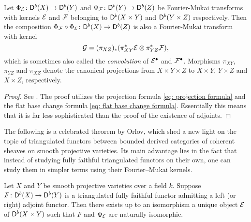 \begin{proposition}
    \label{Composition of fm is fm}
    Let $\Phi_{\mathcal E} \colon \mathsf{D}^b(X) \to \mathsf{D}^b(Y)$ and $\Phi_{\mathcal F} \colon \mathsf{D}^b(Y) \to \mathsf{D}^b(Z)$ be Fourier-Mukai transforms with kernels $\mathcal E$ and $\mathcal F$ belonging to $\mathsf{D}^b(X \times Y)$ and $\mathsf{D}^b(Y \times Z)$ respectively. Then the composition $\Phi_{\mathcal F} \circ \Phi_{\mathcal E} \colon \mathsf{D}^b(X) \to \mathsf{D}^b(Z)$ is also a Fourier-Mukai transform with kernel
    \[
        \mathcal G = (\pi_{XZ})_*(\pi_{XY}^*\mathcal E \otimes \pi_{YZ}^*\mathcal F),
    \]
    which is sometimes also called the \emph{convolution} of $\mathcal E^\bullet$ and $\mathcal F^\bullet$. Morphisms $\pi_{XY}$, $\pi_{YZ}$ and $\pi_{XZ}$ denote the canonical projections from $X \times Y \times Z$ to $X \times Y$, $Y \times Z$ and $X \times Z$, respectively.
\end{proposition}

\begin{proof}
    See \cite[\S 5, 5.10]{huybrechts2006fouriermukai}. The proof utilizes the projection formula \eqref{eq: projection formula} and the flat base change formula \eqref{eq: flat base change formula}. Essentially this means that it is far less sophisticated than the proof of the existence of adjoints.    
\end{proof}

The following is a celebrated theorem by Orlov, which shed a new light on the topic of triangulated functors between bounded derived categories of coherent sheaves on smooth projective varieties. Its main advantage lies in the fact that instead of studying fully faithful triangulated functors on their own, one can study them in simpler terms using their Fourier--Mukai kernels. 

\begin{theorem}
    \label{Orlov's theorem}
    Let $X$ and $Y$ be smooth projective varieties over a field $k$. Suppose $F \colon \mathsf{D}^b(X) \to \mathsf{D}^b(Y)$ is a triangulated fully faithful functor admitting a left (or right) adjoint functor. Then there exists up to an isomorphism a unique object $\mathcal E$ of $\mathsf{D}^b(X \times Y)$ such that $F$ and $\Phi_{\mathcal E}$ are naturally isomorphic.
\end{theorem}

